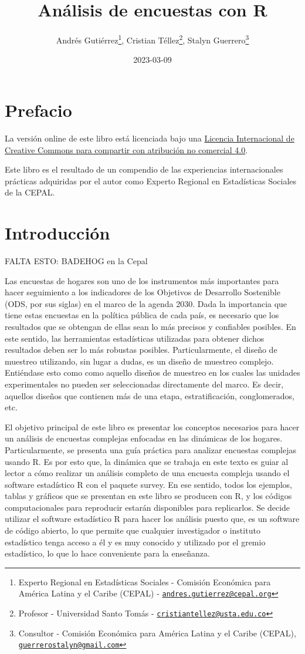 \documentclass[
  12pt,
]{book}
\title{Análisis de encuestas con R}
\author{Andrés Gutiérrez\footnote{Experto Regional en Estadísticas Sociales - Comisión Económica para América Latina y el Caribe (CEPAL) - \href{mailto:andres.gutierrez@cepal.org}{\nolinkurl{andres.gutierrez@cepal.org}}}, Cristian Téllez\footnote{Profesor - Universidad Santo Tomás - \href{mailto:cristiantellez@usta.edu.co}{\nolinkurl{cristiantellez@usta.edu.co}}}, Stalyn Guerrero\footnote{Consultor - Comisión Económica para América Latina y el Caribe (CEPAL), \href{mailto:guerrerostalyn@gmail.com}{\nolinkurl{guerrerostalyn@gmail.com}}}}
\date{2023-03-09}
\begin{document}
\maketitle

{
\hypersetup{linkcolor=}
\setcounter{tocdepth}{1}
\tableofcontents
}
\listoffigures
\listoftables
\hypertarget{prefacio}{%
\chapter*{Prefacio}\label{prefacio}}

La versión online de este libro está licenciada bajo una \href{http://creativecommons.org/licenses/by-nc-sa/4.0/}{Licencia Internacional de Creative Commons para compartir con atribución no comercial 4.0}.

Este libro es el resultado de un compendio de las experiencias internacionales prácticas adquiridas por el autor como Experto Regional en Estadísticas Sociales de la CEPAL.

\hypertarget{introducciuxf3n}{%
\chapter{Introducción}\label{introducciuxf3n}}

FALTA ESTO: BADEHOG en la Cepal

Las encuestas de hogares son uno de los instrumentos más importantes para hacer seguimiento a los indicadores de los Objetivos de Desarrollo Sostenible (ODS, por sus siglas) en el marco de la agenda 2030. Dada la importancia que tiene estas encuestas en la política pública de cada país, es necesario que los resultados que se obtengan de ellas sean lo más precisos y confiables posibles. En este sentido, las herramientas estadísticas utilizadas para obtener dichos resultados deben ser lo más robustas posibles. Particularmente, el diseño de muestreo utilizando, sin lugar a dudas, es un diseño de muestreo complejo. Entiéndase esto como como aquello diseños de muestreo en los cuales las unidades experimentales no pueden ser seleccionadas directamente del marco. Es decir, aquellos diseños que contienen más de una etapa, estratificación, conglomerados, etc.

El objetivo principal de este libro es presentar los conceptos necesarios para hacer un análisis de encuestas complejas enfocadas en las dinámicas de los hogares. Particularmente, se presenta una guía práctica para analizar encuestas complejas usando R. Es por esto que, la dinámica que se trabaja en este texto es guiar al lector a cómo realizar un análisis completo de una encuesta compleja usando el software estadístico R con el paquete survey. En ese sentido, todos los ejemplos, tablas y gráficos que se presentan en este libro se producen con R, y los códigos computacionales para reproducir estarán disponibles para replicarlos. Se decide utilizar el software estadístico R para hacer los análisis puesto que, es un software de código abierto, lo que permite que cualquier investigador o instituto estadístico tenga acceso a él y es muy conocido y utilizado por el gremio estadístico, lo que lo hace conveniente para la enseñanza.
\end{document}
